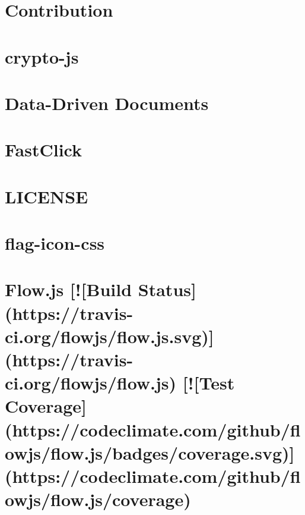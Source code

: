 \documentclass[twoside]{book}
\newcommand{\+}{\discretionary{\mbox{\scriptsize$\hookleftarrow$}}{}{}}
\begin{document}
\chapter{Contribution}
\label{md_app_web_bower_components_crypto-js__c_o_n_t_r_i_b_u_t_i_n_g}

\chapter{crypto-\/js}
\label{md_app_web_bower_components_crypto-js__r_e_a_d_m_e}

\chapter{Data-\/\+Driven Documents}
\label{md_app_web_bower_components_d3__r_e_a_d_m_e}

\chapter{Fast\+Click}
\label{md_app_web_bower_components_fastclick__r_e_a_d_m_e}

\chapter{L\+I\+C\+E\+N\+SE}
\label{md_app_web_bower_components_file-saver__l_i_c_e_n_s_e}

\chapter{flag-\/icon-\/css}
\label{md_app_web_bower_components_flag-icon-css__r_e_a_d_m_e}

\chapter{Flow.\+js \mbox{[}!\mbox{[}Build Status\mbox{]}(https\+://travis-\/ci.org/flowjs/flow.js.\+svg)\mbox{]}(https\+://travis-\/ci.org/flowjs/flow.js) \mbox{[}!\mbox{[}Test Coverage\mbox{]}(https\+://codeclimate.com/github/flowjs/flow.js/badges/coverage.svg)\mbox{]}(https\+://codeclimate.com/github/flowjs/flow.js/coverage)}
\label{md_app_web_bower_components_flow_8js__r_e_a_d_m_e}

\end{document}
